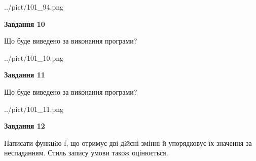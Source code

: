 \documentclass[12pt, ukrainian]{article}
\begin{document}
{\begin {large}
\begin{center}
	{../pict/101_94.png}
\end{center}
\newpage

{\begin {center}\textbf{Завдання 10}\end {center}}

Що буде виведено за виконання програми?\par
\begin{center}
	{../pict/101_10.png}
\end{center}
\newpage

{\begin {center}\textbf{Завдання 11}\end {center}}

Що буде виведено за виконання програми?\par
\begin{center}
	{../pict/101_11.png}
\end{center}
\newpage

{\begin {center}\textbf{Завдання 12}\end {center}}


Написати функцiю f, що отримує дві дiйсні змінні й упорядковує їх значення за неспаданням. Стиль запису умови також оцінюється.\par
\newpage

\end {large}}
\end{document}
